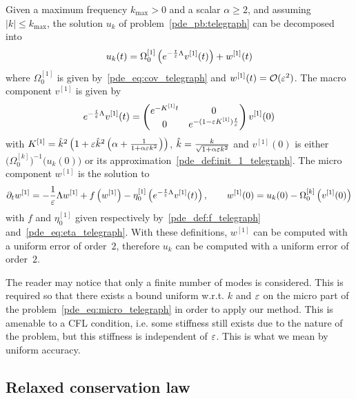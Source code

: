 \begin{proposition} \label{pde_prop:telegraph}
Given a maximum frequency $k_{\max} > 0$ and a scalar $\alpha \geq 2$, and assuming $|k| \leq k_{\max}$, 
the solution $u_k$ of problem~\eqref{pde_pb:telegraph} can be decomposed into 
$$
u_k(t) = \Omega^{[1]}_0 \left( e^{-\frac{t}{\varepsilon}\Lambda} v^{[1]}(t) \right) + w^{[1]}(t) 
$$
where $\Omega^{[1]}_0$ is given by~\eqref{pde_eq:cov_telegraph} and $w^{[1]}(t) = \mathcal{O}(\varepsilon^2)$. 
The macro component $v^{[1]}$ is given by 
$$ 
e^{-\frac{t}{\varepsilon}\Lambda} v^{[1]}(t) = \begin{pmatrix}
e^{-K^{[1]} t} & 0 \\ 0 & e^{-(1-\varepsilon K^{[1]}) \frac{t}{\varepsilon}} 
\end{pmatrix} 
v^{[1]}(0) 
$$ 
with $K^{[1]} = \hat{k}^2 \left( 1 + \varepsilon \hat{k}^2 \left( \alpha + \frac{1}{1 + \alpha \varepsilon k^2} \right) \right) $, 
$\hat{k} = \frac{k}{ \sqrt{1 + \alpha \varepsilon k^2} }$ 
and $v^{[1]}(0)$ is either $\big( \Omega^{[k]}_0 \big) ^{-1} \big( u_k(0) \big)$ 
or its approximation~\eqref{pde_def:init_1_telegraph}. 
The micro component $w^{[1]}$ is the solution to 
$$
\partial_t w^{[1]} 
= -\frac{1}{\varepsilon} \Lambda w^{[1]} + f \left( w^{[1]} \right) 
- \eta^{[1]}_0 \left( e^{-\frac{t}{\varepsilon} \Lambda} v^{[1]}(t) \right) ,
\qquad 
w^{[1]}(0) = u_k(0) - \Omega^{[k]}_0 \left( v^{[1]}(0) \right)
$$
with $f$ and $\eta^{[1]}_0$ given respectively
by~\eqref{pde_def:f_telegraph} and~\eqref{pde_eq:eta_telegraph}. With
these definitions, $w^{[1]}$ can be computed with a uniform error of
order~$2$, therefore $u_k$ can be computed with a uniform error of
order~$2$. 
\end{proposition}

The reader may notice that only a finite number of modes is considered.
This is required so that there exists a bound uniform w.r.t. $k$ and
$\varepsilon$ on the micro part of the problem~\eqref{pde_eq:micro_telegraph} in
order to apply our method. This is amenable to a CFL condition, i.e. some
stiffness still exists due to the nature of the problem, but this
stiffness is independent of $\varepsilon$. This is what we mean by uniform
accuracy.


\subsection{Relaxed conservation law}
\label{pde_subsec:conservation}
\newcommand{\Dx}{\Delta x}
\newcommand{\rlxcont}{\tilde{u}}
\newcommand{\rlxdisc}{\tilde{U}}
\renewcommand{\xvar}{U_1}
\renewcommand{\zvar}{U_2}

